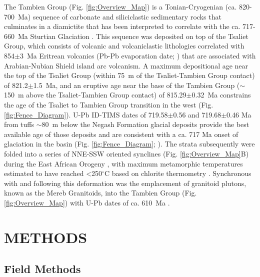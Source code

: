 \documentclass[11pt,letterpaper]{article}
\newcommand{\degC}{$^{\circ}$C\xspace}
\begin{document}
The Tambien Group (Fig. \ref{fig:Overview_Map}) is a Tonian-Cryogenian (ca. 820-700~Ma) sequence of carbonate and siliciclastic sedimentary rocks that culminates in a diamictite that has been interpreted to correlate with the ca. 717-660~Ma Sturtian Glaciation \citep{Beyth2003a, Alene2006a, Miller2009a, Swanson-Hysell2015a, MacLennan2018a}. This sequence was deposited on top of the Tsaliet Group, which consists of volcanic and volcaniclastic lithologies correlated with 854$\pm$3~Ma Eritrean volcanics (Pb-Pb evaporation date; \citealp{Teklay1997a}) that are associated with Arabian-Nubian Shield island arc volcanism. A maximum depositional age near the top of the Tsaliet Group (within 75~m of the Tsaliet-Tambien Group contact) of 821.2$\pm$1.5~Ma, and an eruptive age near the base of the Tambien Group ($\sim$150~m above the Tsaliet-Tambien Group contact) of 815.29$\pm$0.32~Ma \citep{Swanson-Hysell2015a} constrains the age of the Tsaliet to Tambien Group transition in the west (Fig. \ref{fig:Fence_Diagram}). U-Pb ID-TIMS dates of 719.58$\pm$0.56 and 719.68$\pm$0.46 Ma from tuffs $\sim$80~m below the Negash Formation glacial deposits provide the best available age of those deposits and are consistent with a ca. 717 Ma onset of glaciation in the basin (Fig. \ref{fig:Fence_Diagram}; \citealp{MacLennan2018a}). The strata subsequently were folded into a series of NNE-SSW oriented synclines (Fig. \ref{fig:Overview_Map}B) during the East African Orogeny \citep{Stern1994a}, with maximum metamorphic temperatures estimated to have reached \textless250\degC based on chlorite thermometry \citep{Alene1998a}. Synchronous with and following this deformation was the emplacement of granitoid plutons, known as the Mereb Granitoids, into the Tambien Group (Fig. \ref{fig:Overview_Map}) with U-Pb dates of ca. 610~Ma \citep{Miller2003a, Avigad2007a}.

\section*{METHODS \label{sec:METHODS}}

\subsection*{Field Methods \label{sec:FieldMethods}}
\end{document}
